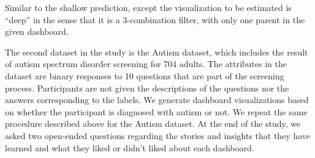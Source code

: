  Similar to the shallow prediction, except the visualization to be estimated is ``deep'' in the sense that it is a 3-combination filter, with only one parent in the given dashboard. 

\par The second dataset in the study is the Autism dataset\cite{autism}, which includes the result of autism spectrum disorder screening for 704 adults. The attributes in the dataset are  binary responses to 10 questions that are part of the screening process. Participants are not given the descriptions of the questions nor the answers corresponding to the labels. We generate dashboard visualizations based on whether the participant is diagnosed with autism or not. We repeat the same procedure described above for the Autism dataset. At the end of the study, we asked two open-ended questions regarding the stories and insights that they have learned and what they liked or didn't liked about each dashboard.
